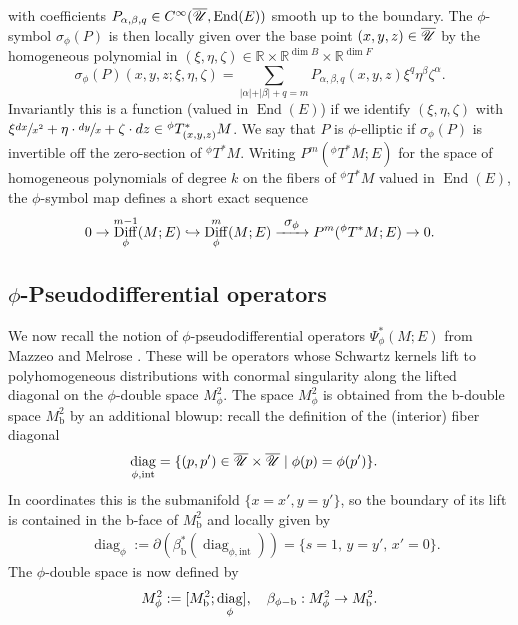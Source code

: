 \documentclass[11pt]{article}
\numberwithin{equation}{section}
\newcommand\hto{\mathrel{\lhook\joinrel\to}}
\newcommand\To[1]{\mathchoice{\xrightarrow{\textstyle\kern4pt#1\kern3pt}}{\stackrel{#1}{\longrightarrow}}{}{}}
\newcommand{\phib}{{\phi\textup{-}\bb}}
\theoremstyle{plain}
\theoremstyle{definition}
\newcommand{\R}{{\mathbb{R}}}
\newcommand{\bb}{{\mathrm{b}}}
\DeclareMathOperator\diag{diag}
\DeclareMathOperator{\Diff}{Diff}
\DeclareMathOperator{\End}{End}
\newcommand{\phiT}{{}^\phi T}
\begin{document}
with coefficients $P_{\alpha,\beta,q}\in C^\infty(\overline{\U},\End(E))$ smooth up to the boundary.
The $\phi$-symbol $\sigma_{\phi}(P)$ is then locally given
over the base point $(x,y,z) \in \overline{\mathscr{U}}$ by
the homogeneous polynomial in $(\xi, \eta, \zeta) \in \R\times\R^{\dim B}\times\R^{\dim F}$
\begin{equation}\label{phi-diff}
\sigma_{\phi}(P) (x,y,z; \xi, \eta, \zeta)= \sum_{\vert \alpha \vert + \vert \beta \vert + q = m}
P_{\alpha,\beta,q}(x,y,z)\xi^{q}\eta^\beta \zeta^{\alpha}.
\end{equation}
Invariantly this is a function (valued in $\End(E)$) if we identify $(\xi,\eta,\zeta)$ with $\xi\sfrac{dx}{x^2}+\eta\cdot\sfrac{dy}x+\zeta\cdot dz\in \phiT^{*}_{(x,y,z)}M$.
We say that $P$ is $\phi$-elliptic if $\sigma_{\phi}(P)$ is
invertible off the zero-section of $\phiT^{*}M$.
Writing $P^{m}(\phiT^{*}M; E)$ for the space of
homogeneous polynomials of degree $k$ on the fibers of $\phiT^{*}M$ valued in $\End(E)$, the
$\phi$-symbol map defines a short exact sequence
\begin{equation}
0 \to \Diff_{\phi}^{m-1}(M; E) \hto \Diff_{\phi}^{m}(M; E)
\To{\sigma_{\phi}} P^{m}(\phiT^{*}M; E) \to 0.
\end{equation}

\subsection{\texorpdfstring{$\phi$}{phi}-Pseudodifferential operators} \label{subsec:phi psido}
We now recall the notion of $\phi$-pseudodif\-ferential operators $\Psi^{*}_{\phi}(M; E)$ from
Mazzeo and Melrose \cite{mazzeo1998pseudodifferential}. These will be opera\-tors whose
Schwartz kernels lift to polyhomogeneous distributions with conormal singularity along
the lifted diagonal on the $\phi$-double space $M^2_\phi$. The space $M^2_\phi$ is obtained from
the b-double space $M^{2}_\bb$ by an additional blowup:
recall the definition of the (interior) fiber diagonal
\begin{align*}
&\diag_{\phi,\mathrm{int}} = \{ (p, p') \in \overline{\U} \times
\overline{\U}\mid \phi(p) = \phi(p')\}.
\end{align*}
In coordinates this is the submanifold $\{x=x', y=y'\}$, so the boundary of its lift is contained in the b-face of $M^2_\bb$ and locally given by
\begin{align*}
&\diag_\phi :=
\partial(\beta_\bb^*(\diag_{\phi,\mathrm{int}})) = \{s=1,\,y = y',\,x'=0\}.
\end{align*}
The $\phi$-double space is now defined by
\begin{equation}\label{phi-double}
M_{\phi}^{2} := [M^{2}_\bb; \diag_\phi],\quad \beta_{\phib}:M_\phi^2\to M_\bb^2.
\end{equation}
\end{document}
